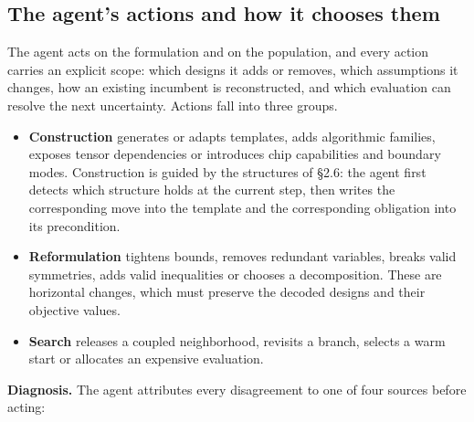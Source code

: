 \documentclass[11pt]{article}
\providecommand{\tightlist}{\setlength{\itemsep}{0pt}\setlength{\parskip}{0pt}}
\begin{document}
\hypertarget{the-agents-actions-and-how-it-chooses-them}{%
\subsection{The agent's actions and how it chooses them}\label{the-agents-actions-and-how-it-chooses-them}}

The agent acts on the formulation and on the population, and every action carries an explicit scope: which designs it adds or removes, which assumptions it changes, how an existing incumbent is reconstructed, and which evaluation can resolve the next uncertainty. Actions fall into three groups.

\begin{itemize}
\tightlist
\item
  \textbf{Construction} generates or adapts templates, adds algorithmic families, exposes tensor dependencies or introduces chip capabilities and boundary modes. Construction is guided by the structures of §2.6: the agent first detects which structure holds at the current step, then writes the corresponding move into the template and the corresponding obligation into its precondition.
\item
  \textbf{Reformulation} tightens bounds, removes redundant variables, breaks valid symmetries, adds valid inequalities or chooses a decomposition. These are horizontal changes, which must preserve the decoded designs and their objective values.
\item
  \textbf{Search} releases a coupled neighborhood, revisits a branch, selects a warm start or allocates an expensive evaluation.
\end{itemize}

\textbf{Diagnosis.} The agent attributes every disagreement to one of four sources before acting:
\end{document}
